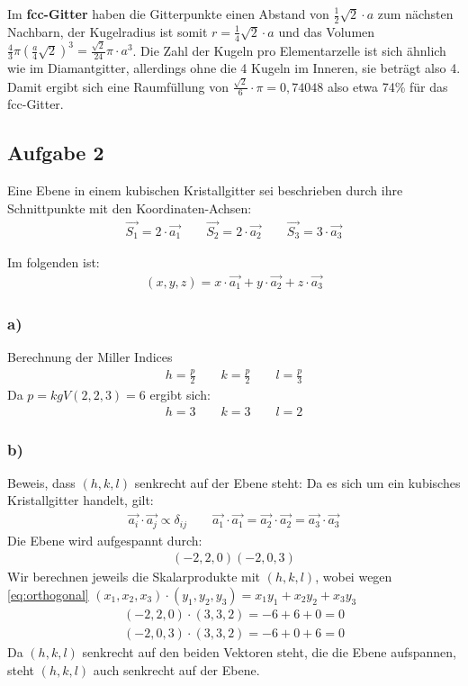\documentclass[11pt]{article}
\begin{document}
Im \textbf{fcc-Gitter} haben die Gitterpunkte einen Abstand von
$\frac{1}{2} \sqrt{2} \cdot a$ zum nächsten Nachbarn, der Kugelradius ist somit
$r = \frac{1}{4} \sqrt{2} \cdot a$ und das Volumen $\frac{4}{3} \pi \left(\frac{a}{4} \sqrt{2}\right)^3 = \frac{\sqrt{2}}{24} \pi\cdot a^3$. Die Zahl der Kugeln pro
Elementarzelle ist sich ähnlich wie im Diamantgitter, allerdings ohne die 4
Kugeln im Inneren, sie beträgt also 4. Damit ergibt sich eine Raumfüllung von
$\frac{\sqrt{2}}{6} \cdot \pi = 0,74048$ also etwa 74\% für das fcc-Gitter.

\subsection*{Aufgabe 2}
Eine Ebene in einem kubischen Kristallgitter sei beschrieben durch ihre Schnittpunkte mit den Koordinaten-Achsen:
\begin{align*}
\vec{S_1} = 2\cdot \vec{a_1} \qquad \vec{S_2}=2\cdot\vec{a_2}\qquad
\vec{S_3}=3\cdot\vec{a_3}
\end{align*}

Im folgenden ist:
\begin{align*}
(x,y,z)=x\cdot\vec{a_1}+y\cdot\vec{a_2}+z\cdot\vec{a_3}
\end{align*}

\subsubsection*{a)}

Berechnung der Miller Indices
\begin{align*}
h = \frac{p}{2}\qquad k = \frac{p}{2}\qquad l = \frac{p}{3}
\end{align*}
Da $p=kgV(2,2,3)=6$ ergibt sich:
\begin{align*}
h = 3\qquad k = 3\qquad l = 2
\end{align*}

\subsubsection*{b)}

Beweis, dass $(h,k,l)$ senkrecht auf der Ebene steht:
Da es sich um ein kubisches Kristallgitter handelt, gilt:
\begin{align}
\label{eq:orthogonal}
\vec{a_i}\cdot\vec{a_j}\propto \delta_{ij}\qquad
\vec{a_1}\cdot\vec{a_1}=\vec{a_2}\cdot\vec{a_2}=\vec{a_3}\cdot\vec{a_3}
\end{align}
Die Ebene wird aufgespannt durch:
\begin{align*}
(-2,2,0)
(-2,0,3)
\end{align*}
Wir berechnen jeweils die Skalarprodukte mit $(h,k,l)$, wobei wegen \eqref{eq:orthogonal} $(x_1,x_2,x_3)\cdot(y_1,y_2,y_3) = x_1y_1+x_2y_2+x_3y_3$
\begin{align*}
(-2,2,0)\cdot(3,3,2)=-6+6+0=0\\
(-2,0,3)\cdot(3,3,2)=-6+0+6=0
\end{align*}
Da $(h,k,l)$ senkrecht auf den beiden Vektoren steht, die die Ebene aufspannen, steht $(h,k,l)$ auch senkrecht auf der Ebene.
\end{document}
